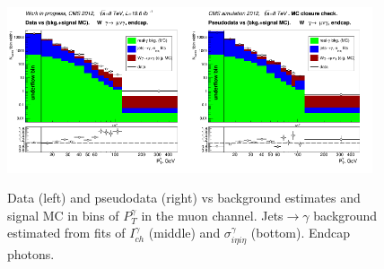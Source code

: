 \begin{figure}[htb]
\begin{center}
\includegraphics[width=0.48\textwidth]{../figs/figs_v11/MUON_WGamma/PrepareYields/c_DATAvsBkgPlusSigMCc_MUON_WGamma_TEMPL_SIHIH_UNblind__Endcap__phoEt.png}\includegraphics[width=0.48\textwidth]{../figs/figs_v11/MUON_WGamma/PrepareYields/c_DATAvsBkgPlusSigMCc_MUON_WGamma_TEMPL_SIHIH_UNblind_MCclosure__Endcap__phoEt_MCclosure.png}
  \caption{Data (left) and pseudodata (right) vs background estimates and signal MC in bins of $P_T^{\gamma}$ in the muon channel. Jets$\rightarrow\gamma$ background estimated from fits of $I_{ch}^{\gamma}$ (middle) and  $\sigma_{i\eta i\eta}^{\gamma}$ (bottom). Endcap photons. }
  \label{fig:DATAvsBKGandSIGMC_MCclosure_MUON_E}
  \end{center}
\end{figure}

